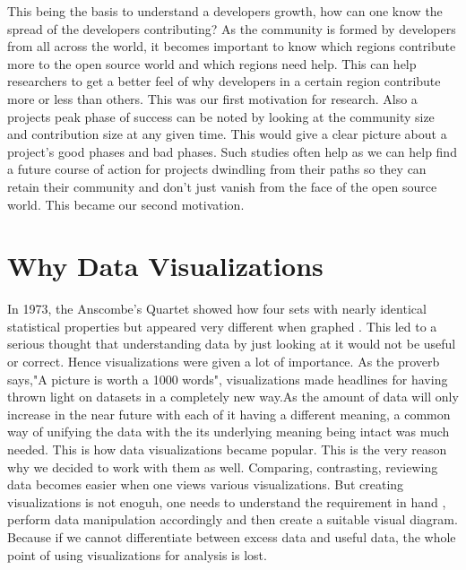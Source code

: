 \documentclass[double,12pt]{beavtex}
\begin{document}
This being the basis to understand a developers growth, how can one know the spread of the developers contributing? As the community is formed by developers from all across the world, it becomes important to know which regions contribute more to the open source world and which regions need help. This can help researchers to get a better feel of why developers in a certain region contribute more or less than others. This was our first motivation for research. Also a projects peak phase of success can be noted by looking at the community size and contribution size at any given time. This would give a clear picture about a project's good phases and bad phases. Such studies often help as we can help find a future course of action for projects dwindling from their paths so they can retain their community and don't just vanish from the face of the open source world. This became our second motivation.

\section{Why Data Visualizations}
In 1973, the Anscombe's Quartet showed how four sets with nearly identical statistical properties but appeared very different when graphed \cite{wiki}. This led to a serious thought that understanding data by just looking at it would not be useful or correct. Hence visualizations were given a lot of importance. As the proverb says,"A picture is worth a 1000 words", visualizations made headlines for having thrown light on datasets in a completely new way.As the amount of data will only increase in the near future with each of it having a different meaning, a common way of unifying the data with the its underlying meaning being intact was much needed. This is how data visualizations became popular. This is the very reason why we decided to work with them as well. Comparing, contrasting, reviewing data becomes easier when one views various visualizations. But creating visualizations is not enoguh, one needs to understand the requirement in hand , perform data manipulation accordingly and then create a suitable visual diagram. Because if we cannot differentiate between excess data and useful data, the whole point of using visualizations for analysis is lost.
\end{document}
